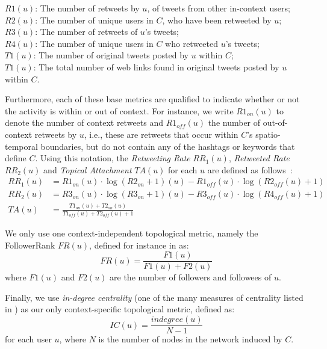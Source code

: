 \documentclass[runningheads]{llncs}
\begin{document}
\noindent 
$R1(u)$: The number of retweets by $u$, of tweets from other in-context users;\\
$R2(u)$: The number of unique users in $C$, who have been retweeted by $u$; \\
$R3(u)$: The number of retweets of $u$'s  tweets; \\
$R4(u)$: The number of unique users in $C$ who retweeted $u$'s tweets; \\
$T1(u)$: The number of original tweets posted by $u$ within $C$; \\
$T1(u)$: The total number of web links found in original tweets posted by $u$ within $C$.

Furthermore, each of these base metrics  are qualified to indicate whether or not the activity is within or out of context.
For instance, we write $R1_{on}(u)$ to denote the number of context retweets and $R1_{off}(u)$ the number of out-of-context retweets by $u$, i.e., these are retweets that occur within $C$'s spatio-temporal boundaries, but do not contain any of the hashtags or keywords that define $C$.  
Using this notation, the \textit{Retweeting Rate} $RR_1(u)$, \textit{Retweeted Rate} $RR_2(u)$ and \textit{Topical Attachment} $TA(u)$ for each $u$ are defined as follows~\cite{Bizid:2015}:
\begin{align}
RR_1(u) & =  R1_{on}(u) \cdot \log(R2_{on}+1)(u) - R1_{off}(u) \cdot \log(R2_{off}(u)+1) \\
RR_2(u) & =  R3_{on}(u) \cdot \log(R3_{on}+1)(u) - R3_{off}(u) \cdot \log(R4_{off}(u)+1) \\
TA(u) & = \frac{T1_{on}(u) + T2_{on}(u)}{T1_{off}(u) + T2_{off}(u) +1} 
\end{align}

We only use one context-independent topological metric, namely the FollowerRank $FR(u)$, defined for instance in \cite{RIQUELME2016949} as:
\begin{equation}
FR(u) = \frac{F1(u)}{F1(u)+F2(u)}
\end{equation}
where $F1(u)$ and $F2(u)$ are the number of followers and followees of $u$.

Finally, we use \textit{in-degree centrality} (one of the many measures of centrality listed in \cite{RIQUELME2016949}) as our only context-specific topological metric, defined as:
\begin{equation}
    IC(u) = \frac{\mathit{indegree}(u)}{N-1}
\end{equation}
for each user $u$, where $N$ is the number of nodes in the network induced by $C$.
\end{document}
